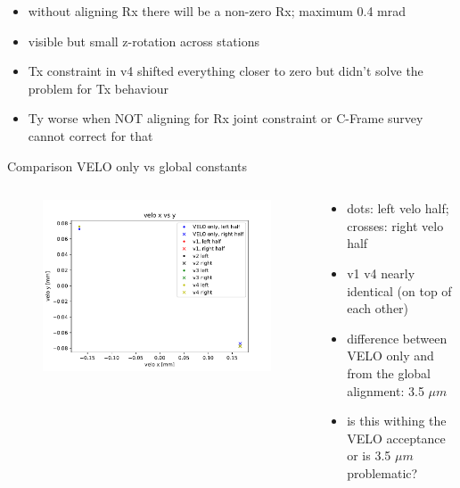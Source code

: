 \documentclass[aspectratio=1610, 12pt]{beamer}
\begin{document}
\begin{frame}
  \begin{itemize}
    \item without aligning Rx there will be a non-zero Rx; maximum 0.4 mrad
    \item visible but small z-rotation across stations
    \item Tx constraint in v4 shifted everything closer to zero but didn't solve the problem for Tx behaviour
    \item Ty worse when NOT aligning for Rx \to joint constraint or C-Frame survey cannot correct for that
  \end{itemize}
\end{frame}

\begin{frame}{Comparison VELO only vs global constants}
  \begin{columns}
    \begin{column}[c]{0.5\textwidth}
      \begin{figure}
        \includegraphics[width=\textwidth]{plots/velo_constants.pdf}
      \end{figure}
    \end{column}
    \begin{column}[c]{0.5\textwidth}
      \begin{itemize}
        \item dots: left velo half; crosses: right velo half
        \item v1 \to v4 nearly identical (on top of each other)
        \item difference between VELO only and from the global alignment: 3.5 $\mu m$
        \item \to is this withing the VELO acceptance or is 3.5 $\mu m$ problematic?
      \end{itemize}
    \end{column}
  \end{columns}
\end{frame}
\end{document}
